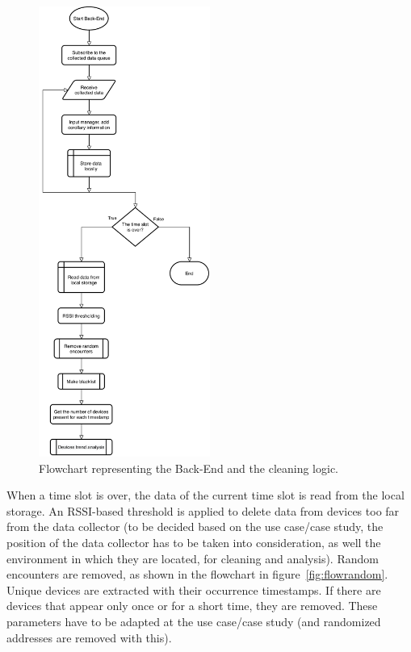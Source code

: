 \begin{figure}[h]
\centering 
\includegraphics[width=0.5\textwidth]{images/flowcleaner} 
\caption{Flowchart representing the Back-End and the cleaning logic.}
\label{fig:flowcleaner}
\end{figure}

When a time slot is over, the data of the current time slot is read from the local storage. An RSSI-based threshold is applied to delete data from devices too far from the data collector (to be decided based on the use case/case study, the position of the data collector has to be taken into consideration, as well the environment in which they are located, for cleaning and analysis). Random encounters are removed, as shown in the flowchart in figure~\ref{fig:flowrandom}. Unique devices are extracted with their occurrence timestamps. If there are devices that appear only once or for a short time,  they are removed. These parameters have to be adapted at the use case/case study (and randomized addresses are removed with this).

